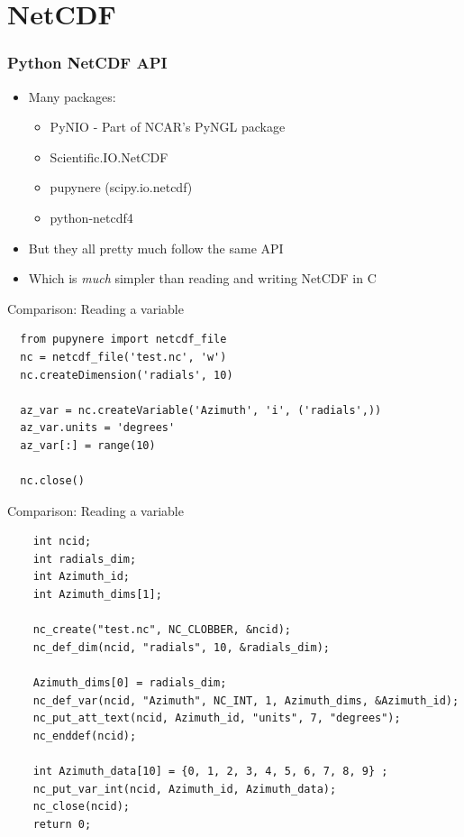 \documentclass[red, hyperref={pdfpagelabels=false}]{beamer}
\begin{document}
\section{NetCDF}
\begin{frame}
  \frametitle{Python NetCDF API}
  \begin{itemize}
    \item Many packages:
    \begin{itemize}
      \item PyNIO - Part of NCAR's PyNGL package
      \item Scientific.IO.NetCDF
      \item pupynere (scipy.io.netcdf)
      \item python-netcdf4
    \end{itemize}
    \item But they all pretty much follow the same API
    \item Which is \emph{much} simpler than reading and writing NetCDF in C
  \end{itemize}
\end{frame}

\begin{frame}[fragile]{Comparison: Reading a variable}
  \lstset{language=Python}
  \begin{lstlisting}
  from pupynere import netcdf_file
  nc = netcdf_file('test.nc', 'w')
  nc.createDimension('radials', 10)

  az_var = nc.createVariable('Azimuth', 'i', ('radials',))
  az_var.units = 'degrees'
  az_var[:] = range(10)

  nc.close()
  \end{lstlisting}
\end{frame}

\begin{frame}[fragile]{Comparison: Reading a variable}
  \lstset{language=C}
  \begin{lstlisting}
    int ncid;
    int radials_dim;
    int Azimuth_id;
    int Azimuth_dims[1];

    nc_create("test.nc", NC_CLOBBER, &ncid);
    nc_def_dim(ncid, "radials", 10, &radials_dim);

    Azimuth_dims[0] = radials_dim;
    nc_def_var(ncid, "Azimuth", NC_INT, 1, Azimuth_dims, &Azimuth_id);
    nc_put_att_text(ncid, Azimuth_id, "units", 7, "degrees");
    nc_enddef(ncid);

    int Azimuth_data[10] = {0, 1, 2, 3, 4, 5, 6, 7, 8, 9} ;
    nc_put_var_int(ncid, Azimuth_id, Azimuth_data);
    nc_close(ncid);
    return 0;
  \end{lstlisting}
\end{frame}
\end{document}
